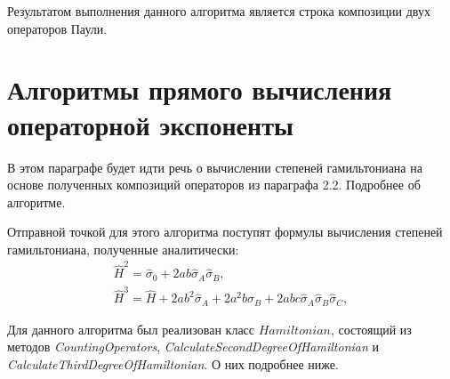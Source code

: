 \documentclass[a4paper]{report}
\begin{document}
Результатом выполнения данного алгоритма является строка композиции двух операторов Паули.
\newpage


\section{Алгоритмы прямого вычисления операторной экспоненты}

В этом параграфе будет идти речь о вычислении степеней гамильтониана на основе полученных композиций операторов из параграфа 2.2. Подробнее об алгоритме.

Отправной точкой для этого алгоритма поступят формулы вычисления степеней гамильтониана, полученные аналитически:
\begin{equation}\tag{9}\label{eq9}
    \begin{array}{cc}
        \hat{H}^2 = \hat{\sigma}_0 + 2ab\hat{\sigma}_A\hat{\sigma}_B,\\
        \hat{H}^3 = \hat{H} + 2ab^2\hat{\sigma}_A + 2a^2b\hat{\sigma}_B + 2abc\hat{\sigma}_A\hat{\sigma}_B\hat{\sigma}_C,
    \end{array}
\end{equation}

Для данного алгоритма был реализован класс $Hamiltonian$, состоящий из методов \textit{CountingOperators}, \textit{CalculateSecondDegreeOfHamiltonian} и \textit{CalculateThirdDegreeOfHamiltonian}. О них подробнее ниже.
\end{document}

